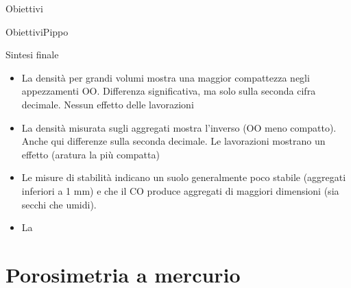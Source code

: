 \documentclass[10pt]{beamer}
\begin{document}
\begin{frame}{Obiettivi}
\begin{frame}{Obiettivi}{Pippo}


\begin{frame}{Sintesi finale}
  \begin{itemize}[<+->]
  \item La densit\`a per grandi volumi mostra una maggior compattezza
    negli appezzamenti OO. Differenza significativa, ma solo sulla
    seconda cifra decimale. Nessun effetto delle lavorazioni
  \item La densit\`a misurata sugli aggregati mostra l'inverso (OO
    meno compatto). Anche qui differenze sulla seconda decimale. Le
    lavorazioni mostrano un effetto (aratura la pi\`u compatta)
  \item Le misure di stabilit\`a indicano un suolo generalmente poco
    stabile (aggregati inferiori a 1 mm) e che il CO produce aggregati
    di maggiori dimensioni (sia secchi che umidi).
  \item La 
  \end{itemize}

\end{frame}
\section{Porosimetria a mercurio}

\begin{frame}
\end{frame}

\appendix



\end{frame}
\end{frame}
\end{document}
